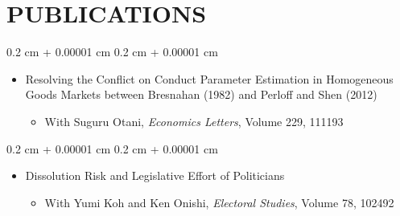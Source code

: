 \documentclass[10pt, letterpaper]{article}
\newenvironment{highlights}{
    \begin{itemize}[
        topsep=0.10 cm,
        parsep=0.10 cm,
        partopsep=0pt,
        itemsep=0.0 cm,
        leftmargin=0.4 cm + 10pt
    ]
}{
    \end{itemize}
} %
\newenvironment{onecolentry}{
    \begin{adjustwidth}{
        0.2 cm + 0.00001 cm
    }{
        0.2 cm + 0.00001 cm
    }
}{
    \end{adjustwidth}
} %
\begin{document}
    \section{PUBLICATIONS}
    \begin{samepage}
        \begin{onecolentry}
            \begin{highlights}
                \item Resolving the Conflict on Conduct Parameter Estimation in Homogeneous Goods Markets between Bresnahan (1982) and Perloff and Shen (2012)
                \begin{highlights}
                    \item With Suguru Otani, \textit{Economics Letters}, Volume 229, 111193
                \end{highlights}
            \end{highlights}
        \end{onecolentry}
    \end{samepage}
    \vspace{0.10 cm}
    \begin{samepage}
        \begin{onecolentry}
            \begin{highlights}
                \item Dissolution Risk and Legislative Effort of Politicians
                \begin{highlights}
                    \item With Yumi Koh and Ken Onishi, \textit{Electoral Studies}, Volume 78, 102492
                \end{highlights}
            \end{highlights}
        \end{onecolentry}
    \end{samepage}
\end{document}
